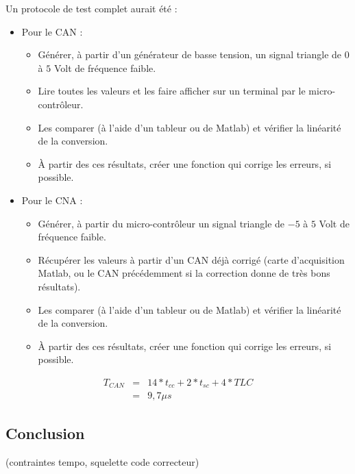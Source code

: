 Un protocole de test complet aurait été :\\
\begin{itemize}
\item Pour le CAN : 
	\begin{itemize}
		\item Générer, à partir d'un générateur de basse tension, un signal triangle de $0$ à $5$ Volt de fréquence faible.
		\item Lire toutes les valeurs et les faire afficher sur un terminal par le micro-contrôleur.
		\item Les comparer (à l'aide d'un tableur ou de Matlab) et vérifier la linéarité de la conversion.
		\item À partir des ces résultats, créer une fonction qui corrige les erreurs, si possible.
	\end{itemize}

\item Pour le CNA :
	\begin{itemize}
		\item Générer, à partir du micro-contrôleur un signal triangle de $-5$ à $5$ Volt de fréquence faible.
		\item Récupérer les valeurs à partir d'un CAN déjà corrigé (carte d'acquisition Matlab, ou le CAN précédemment si la correction donne de très bons résultats).
		\item Les comparer (à l'aide d'un tableur ou de Matlab) et vérifier la linéarité de la conversion.
		\item À partir des ces résultats, créer une fonction qui corrige les erreurs, si possible.
	\end{itemize}
\end{itemize}
\begin{eqnarray}
T_{CAN} &=& 14*t_{cc} + 2*t_{sc} + 4*TLC \\
&=&  9,7 \mu s%
\end{eqnarray}
	\subsection{Conclusion}
	  	(contraintes tempo, squelette code correcteur)
	  	
